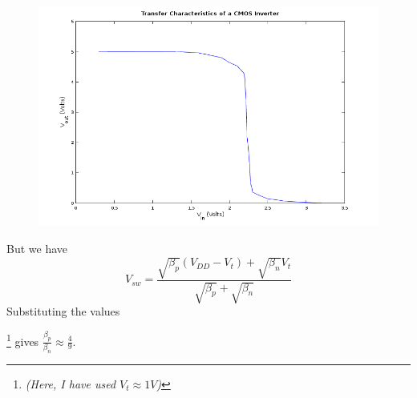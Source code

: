 \documentclass[a4paper, 11pt]{article}
\let\svthefootnote\thefootnote
\begin{document}
\begin{figure}[H]
\centering
\includegraphics[scale=0.55]{Transfer_Characteristics}
\caption{}
\end{figure}
But we have
$$
V_{sw} = \frac{\sqrt{\beta_p}(V_{DD}-V_t) + \sqrt{\beta_n}V_t}{\sqrt{\beta_p} + \sqrt{\beta_n}}
$$
Substituting the values\addtocounter{footnote}{0}\let\thefootnote\svthefootnote\footnote{\em(Here, I have used $V_t \approx 1V$)} gives $\frac{\beta_p}{\beta_n} \approx \frac{4}{9}$.  
\end{document}
